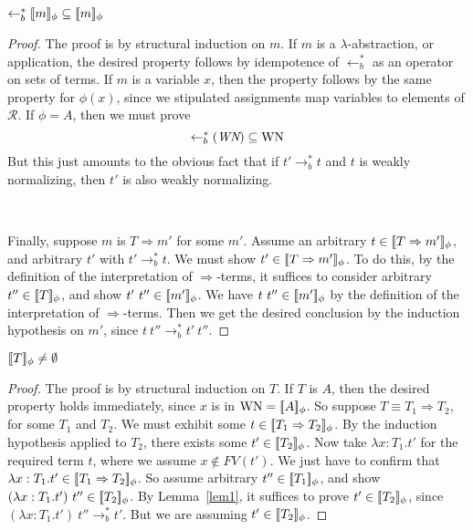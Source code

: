 \documentclass{LMCS}
\newcommand{\To}[0]{\Rightarrow}
\newcommand{\interp}[1]{[\negthinspace[#1]\negthinspace]}
\newcommand{\ot}[0]{\leftarrow}
\begin{document}
\begin{lem}
\label{lem1}
$\ot_b^*\interp{m}_\phi\subseteq \interp{m}_\phi$
\end{lem}
\begin{proof} The proof is by structural induction on $m$.  If $m$ is a $\lambda$-abstraction,
or application, the desired property follows by idempotence of
$\ot_b^*$ as an operator on sets of terms.  If $m$ is a variable $x$,
then the property follows by the same property for $\phi(x)$, since we
stipulated assignments map variables to elements of $\mathcal{R}$.  If
$\phi = A$, then we must prove
\[
\ot_b^*(\textit{WN})\subseteq \textnormal{WN}
\]
\noindent But this just amounts to the obvious fact that if $t'\to_b^*
t$ and $t$ is weakly normalizing, then $t'$ is also weakly
normalizing.

\

\noindent Finally, suppose $m$ is $T\To m'$ for some $m'$.  Assume an
arbitrary $t\in\interp{T\To m'}_\phi$, and arbitrary $t'$ with
$t'\to_b^* t$.  We must show $t'\in\interp{T\To m'}_\phi$.  To do
this, by the definition of the interpretation of $\To$-terms, it
suffices to consider arbitrary $t''\in\interp{T}_\phi$, and show
$t'\ t''\in\interp{m'}_\phi$.  We have $t\ t''\in\interp{m'}_\phi$ by
the definition of the interpretation of $\To$-terms.  Then we get the
desired conclusion by the induction hypothesis on $m'$, since
$t\ t''\to_b^* t'\ t''$.
\end{proof}

\begin{lem}
\label{lem2}
$\interp{T}_\phi \neq \emptyset$
\end{lem}

\begin{proof} The proof is by structural induction on $T$.  If $T$ is $A$, then the
desired property holds immediately, since $x$ is in
$\textnormal{WN} = \interp{A}_\phi$.  So suppose $T\equiv T_1\To T_2$, for some $T_1$
and $T_2$.  We must exhibit some $t\in\interp{T_1\To T_2}_\phi$.  By
the induction hypothesis applied to $T_2$, there exists some
$t'\in\interp{T_2}_\phi$.  Now take $\lambda x:T_1.t'$ for the
required term $t$, where we assume $x\not\in\textit{FV}(t')$.  We just have to confirm that $\lambda
x:T_1.t'\in\interp{T_1\To T_2}_\phi$.  So assume arbitrary
$t''\in\interp{T_1}_\phi$, and show $(\lambda
x:T_1.t')\ t''\in\interp{T_2}_\phi$.  By Lemma~\ref{lem1}, it suffices
to prove $t'\in\interp{T_2}_\phi$, since $(\lambda
x:T_1.t')\ t''\to_b^* t'$.  But we are assuming
$t'\in\interp{T_2}_\phi$.
\end{proof}
\end{document}
